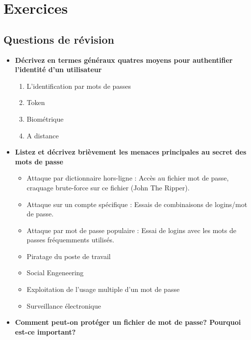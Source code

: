 \documentclass{report}
\begin{document}
	\section{Exercices}

		\subsection{Questions de révision}

			\begin{itemize}
				\item \textbf{Décrivez en termes généraux quatres moyens pour authentifier l'identité d'un utilisateur}\\

					\begin{enumerate}
						\item L'identification par mots de passes
						\item Token
						\item Biométrique
						\item A distance\\
					\end{enumerate}

				\item \textbf{Listez et décrivez brièvement les menaces principales au secret des mots de passe}\\

					\begin{itemize}
						\item Attaque par dictionnaire hors-ligne : Accès au fichier mot de passe, craquage brute-force sur ce fichier (John The Ripper).
						\item Attaque sur un compte spécifique : Essais de combinaisons de logins/mot de passe.
						\item Attaque par mot de passe populaire : Essai de logins avec les mots de passes fréquemments utilisés.
						\item Piratage du poste de travail
						\item Social Engeneering
						\item Exploitation de l'usage multiple d'un mot de passe
						\item Surveillance électronique\\
					\end{itemize}

				\item \textbf{Comment peut-on protéger un fichier de mot de passe? Pourquoi est-ce important?}\\


\end{itemize}
\end{document}
